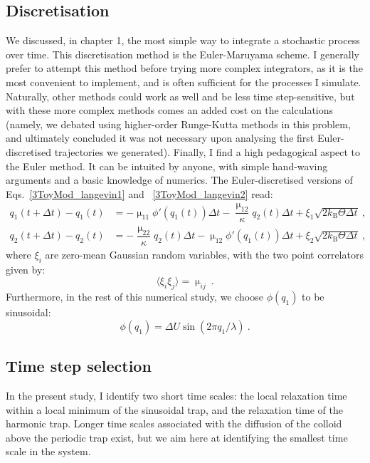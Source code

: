 \subsection{Discretisation}
We discussed, in chapter 1, the most simple way to integrate a stochastic process over time. This discretisation method is the Euler-Maruyama scheme. I generally prefer to attempt this method before trying more complex integrators, as it is the most convenient to implement, and is often sufficient for the processes I simulate. Naturally, other methods could work as well and be less time step-sensitive, but with these more complex methods comes an added cost on the calculations (namely, we debated using higher-order Runge-Kutta methods in this problem, and ultimately concluded it was not necessary upon analysing the first Euler-discretised trajectories we generated). Finally, I find a high pedagogical aspect to the Euler method. It can be intuited by anyone, with simple hand-waving arguments and a basic knowledge of numerics. The Euler-discretised versions of Eqs.~\ref{3ToyMod_langevin1} and ~\ref{3ToyMod_langevin2} read:
\begin{align}
    \label{q1_discretized}
    q_1(t + \Delta t) - q_1(t) &= -\upmu_{11} \phi'(q_1(t))\Delta t - \dfrac{\upmu_{12}}{\kappa}q_2(t)\Delta t + \xi_1 \sqrt{2k_\mathrm{B}\Theta\Delta t}~,\\
q_2(t + \Delta t) - q_2(t) &=  - \dfrac{\upmu_{22}}{\kappa}q_2(t)\Delta t -\upmu_{12} \phi'(q_1(t))\Delta t + \xi_2 \sqrt{2k_\mathrm{B}\Theta\Delta t}~, \label{q2_discretized}
\end{align}
where $\xi_i$ are zero-mean Gaussian random variables, with the two point correlators given by:
\begin{equation}
    \langle \xi_i \xi_j \rangle = \upmu_{ij}~.
\end{equation}
Furthermore, in the rest of this numerical study, we choose $\phi(q_1)$ to be sinusoidal:
\begin{equation}
\phi(q_1) = \Delta U \sin\left(2 \pi q_1/\lambda\right)~.
\end{equation}

\subsection{Time step selection}
 In the present study, I identify two short time scales: the local relaxation time within a local minimum of the sinusoidal trap, and the relaxation time of the harmonic trap. Longer time scales associated with the diffusion of the colloid above the periodic trap exist, but we aim here at identifying the smallest time scale in the system.

